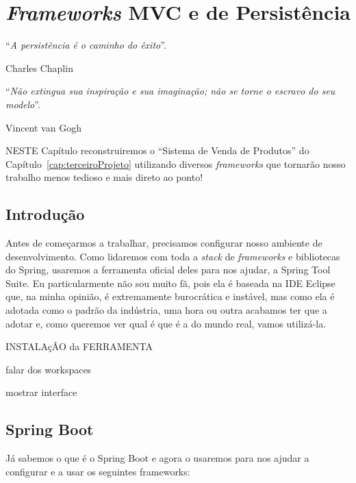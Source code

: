 \chapter{\textit{Frameworks} MVC e de Persistência}\label{cap:frameworksPersistencia}
\epigraph{``\textit{A persistência é o caminho do êxito}''.}{Charles Chaplin}
\epigraph{``\textit{Não extingua sua inspiração e sua imaginação; não se torne o escravo do seu modelo}''.}{Vincent van Gogh}

\lettrine[lines=4, lhang=0.1, lraise=0, loversize=0.2, findent=0.1em]{\textcolor{corTema}{N}}{ESTE} Capítulo reconstruiremos o ``Sistema de Venda de Produtos'' do Capítulo~\ref{cap:terceiroProjeto} utilizando diversos \textit{frameworks} que tornarão nosso trabalho menos tedioso e mais direto ao ponto!

\vfill

\section{Introdução}

Antes de começarmos a trabalhar, precisamos configurar nosso ambiente de desenvolvimento. Como lidaremos com toda a \textit{stack} de \textit{frameworks} e bibliotecas do Spring, usaremos a ferramenta oficial deles para nos ajudar, a Spring Tool Suite. Eu particularmente não sou muito fã, pois ela é baseada na IDE Eclipse que, na minha opinião, é extremamente burocrática e instável, mas como ela é adotada como o padrão da indústria, uma hora ou outra acabamos ter que a adotar e, como queremos ver qual é que é a do mundo real, vamos utilizá-la.

INSTALAçÂO da FERRAMENTA

falar dos workspaces

mostrar interface


\section{Spring Boot}

Já sabemos o que é o Spring Boot e agora o usaremos para nos ajudar a configurar e a usar os seguintes frameworks:

